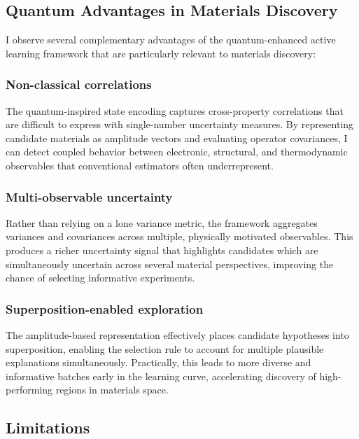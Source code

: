 \documentclass{article}
\begin{document}
\subsection{Quantum Advantages in Materials Discovery}

I observe several complementary advantages of the quantum-enhanced active learning framework that are particularly relevant to materials discovery:

\subsubsection{Non-classical correlations}
The quantum-inspired state encoding captures cross-property correlations that are difficult to express with single-number uncertainty measures. By representing candidate materials as amplitude vectors and evaluating operator covariances, I can detect coupled behavior between electronic, structural, and thermodynamic observables that conventional estimators often underrepresent.

\subsubsection{Multi-observable uncertainty}
Rather than relying on a lone variance metric, the framework aggregates variances and covariances across multiple, physically motivated observables. This produces a richer uncertainty signal that highlights candidates which are simultaneously uncertain across several material perspectives, improving the chance of selecting informative experiments.

\subsubsection{Superposition-enabled exploration}
The amplitude-based representation effectively places candidate hypotheses into superposition, enabling the selection rule to account for multiple plausible explanations simultaneously. Practically, this leads to more diverse and informative batches early in the learning curve, accelerating discovery of high-performing regions in materials space.

\subsection{Limitations}
\end{document}
